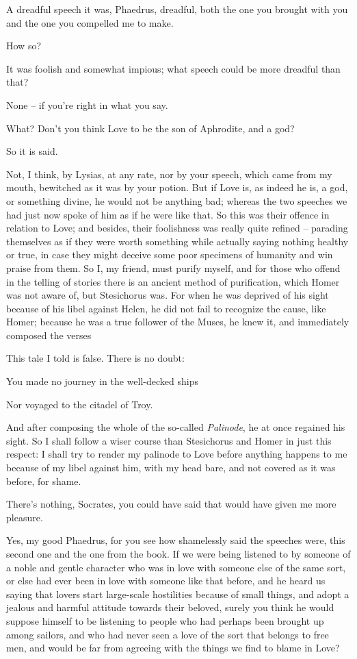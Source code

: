 A dreadful speech it was, Phaedrus, dreadful, both the one you
brought with you and the one you compelled me  to make.

How so?

It was foolish and somewhat impious; what speech could be more
dreadful than that?

None -- if you're right in what you say.

What? Don't you think Love to be the son of Aphrodite, and a
god?

 So it is said.

Not, I think, by Lysias, at any rate, nor by your 
speech, which came from my mouth, bewitched as it was by your
potion. But if Love is,
as indeed he is, a god, or something divine, he would not be anything
bad; whereas the two speeches  we had just now spoke of him as
if he were like that. So this was their offence in relation to Love; and
besides, their  foolishness was really quite refined --
parading themselves as if they were worth something while actually
saying nothing healthy or true, in case they might deceive some poor
specimens of humanity and win praise from them. So I, my friend, must
purify myself, and for those who offend in the telling of stories there
is an ancient method of purification, which Homer was  not aware
of, but Stesichorus was.
For when he was deprived of his sight because of his libel against
Helen, he did not fail to recognize the cause, like Homer; because he
was a true follower of the
Muses, he knew it, and
immediately composed the verses

This tale I told is false. There is no doubt:

You made no journey in the well-decked ships

 Nor voyaged to the citadel of
Troy.

And after composing the whole of the so-called
{\em Palinode}, he at
once regained his sight. So I shall follow a wiser course than
Stesichorus and Homer in just this respect: I shall try to render
 my palinode to Love before anything happens to me because of my
libel against him, with my head bare, and not covered as it was before,
for shame.

There's nothing, Socrates, you could have said that would have
given me more pleasure.

 Yes, my good Phaedrus, for you see how shamelessly
said the speeches were, this second one and the one from the book. If we
were being listened to by someone of a noble and gentle character who
was in love with someone else of the same sort, or else had ever been in
love with someone like that before,  and he heard us saying that
lovers start large-scale hostilities because of small things, and adopt
a jealous and harmful attitude towards their beloved, surely you think
he would suppose himself to be listening to people who had perhaps been
brought up among sailors, and who had never seen a love of the sort that
belongs to free men, and
would be far from agreeing with  the things we find to blame in
Love?


